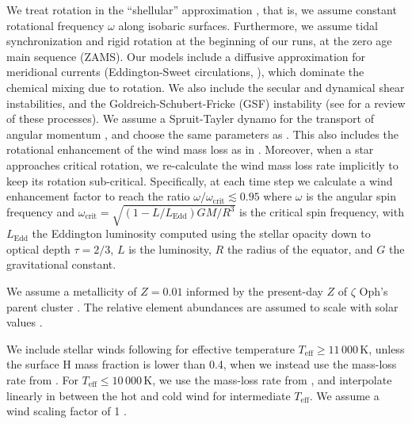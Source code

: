 \documentclass[twocolumn,twocolappendix,trackchanges]{aastex63}
\newcommand{\kms}{{\mathrm{km\ s^{-1}}}}
\newcommand{\zoph}{$\zeta$ Oph}
\begin{document}
We treat rotation in the ``shellular'' approximation
\citep[e.g.,][]{zahn:92, ekstrom:12}, that is, we assume constant
rotational frequency $\omega$ along isobaric surfaces. Furthermore, we
assume tidal synchronization and rigid rotation at the beginning of
our runs, at the zero age main sequence (ZAMS). %
Our models include a diffusive
approximation for meridional currents (Eddington-Sweet circulations,
\citealt{sweet:50}), which dominate the chemical mixing due to
rotation. We also include the secular and dynamical shear
instabilities, and the Goldreich-Schubert-Fricke (GSF) instability
(see \cite{heger:00} for a review of these processes).
We assume a
Spruit-Tayler dynamo for the transport of angular momentum
\citep{spruit:02}, and choose the same parameters as
\cite{heger:00}. This also includes the rotational enhancement of the
wind mass loss as in \cite{langer:98}. Moreover, when a star
approaches critical rotation, we re-calculate the wind mass
loss rate implicitly to keep its rotation sub-critical. Specifically, at each
time step we calculate a wind enhancement factor to reach the ratio
$\omega/\omega_\mathrm{crit}\lesssim 0.95$ where $\omega$ is the
angular spin frequency and
$\omega_\mathrm{crit}=\sqrt{(1-L/L_\mathrm{Edd})GM/R^3}$ is the critical spin frequency, with
$L_\mathrm{Edd}$ the Eddington luminosity computed using the stellar
opacity down to optical depth $\tau=2/3$, $L$ is the luminosity, $R$
the radius of the equator, and $G$ the gravitational
constant. %

We assume a metallicity of $Z=0.01$ informed by the present-day $Z$ of
\zoph's parent cluster \citep{murphy:21}. The relative
element abundances are assumed to scale with solar values \citep{grevesse:98}.

We include stellar winds following \cite{vink:00,vink:01} for
effective temperature $T_\mathrm{eff}\geq 11\,000$\,K, unless the
surface H mass fraction is lower than 0.4, when we instead use
the mass-loss rate from \cite{nugis:00}. For $T_\mathrm{eff}\leq 10\,000$\,K, we use the
mass-loss rate from \cite{dejager:88}, and interpolate linearly in
between the hot and cold wind for intermediate $T_\mathrm{eff}$.
We assume a wind scaling factor of 1 \citep{smith:14, renzo:17}.
\end{document}
